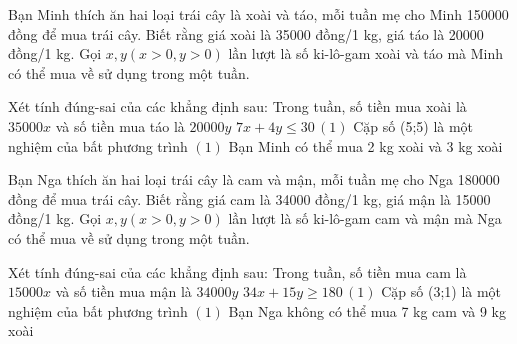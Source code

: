 \begin{ex}
 Bạn Minh thích ăn hai loại trái cây là xoài và táo, mỗi tuần mẹ cho Minh 150000 đồng để mua trái cây. Biết rằng giá xoài là 35000 đồng/1 kg, giá táo là 20000 đồng/1 kg. Gọi $x, y (x>0, y>0)$ lần lượt là số ki-lô-gam xoài và táo mà Minh có thể mua về sử dụng trong một tuần.

 Xét tính đúng-sai của các khẳng định sau:
\choiceTFt
{ \True Trong tuần, số tiền mua xoài là ${35000x}$ và số tiền mua táo là ${20000y}$ }
   { \True $7 x + 4 y\le 30 \, (1)$ }
     { Cặp số (5;5) là một nghiệm của bất phương trình $(1)$ }
    { \True  Bạn Minh có thể mua 2 kg xoài và 3 kg xoài }
\end{ex}

\begin{ex}
 Bạn Nga thích ăn hai loại trái cây là cam và mận, mỗi tuần mẹ cho Nga 180000 đồng để mua trái cây. Biết rằng giá cam là 34000 đồng/1 kg, giá mận là 15000 đồng/1 kg. Gọi $x, y (x>0, y>0)$ lần lượt là số ki-lô-gam cam và mận mà Nga có thể mua về sử dụng trong một tuần.

 Xét tính đúng-sai của các khẳng định sau:
\choiceTFt
{ Trong tuần, số tiền mua cam là ${15000x}$ và số tiền mua mận là ${34000y}$ }
   { $34 x + 15 y\ge 180 \, (1)$ }
     { \True  Cặp số (3;1) là một nghiệm của bất phương trình $(1)$ }
    { \True  Bạn Nga không có thể mua 7 kg cam và 9 kg xoài }
\end{ex}

